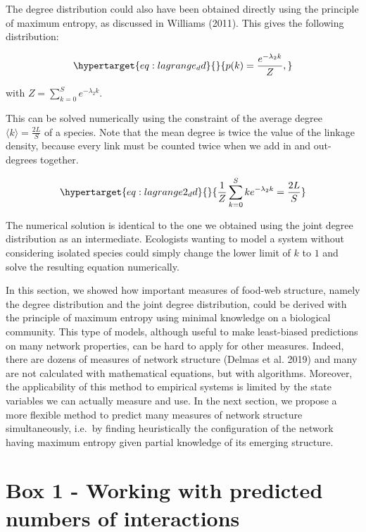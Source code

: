 \documentclass[10pt,oneside]{article}
\begin{document}
The degree distribution could also have been obtained directly using the
principle of maximum entropy, as discussed in Williams (2011). This
gives the following distribution:

\begin{equation}\protect\hypertarget{eq:lagrange_dd}{}{p(k) = \frac{e^{-\lambda_2k}}{Z},}\label{eq:lagrange_dd}\end{equation}

with \(Z = \sum_{k=0}^S e^{-\lambda_2k}.\)

This can be solved numerically using the constraint of the average
degree \(\langle k \rangle = \frac{2L}{S}\) of a species. Note that the
mean degree is twice the value of the linkage density, because every
link must be counted twice when we add in and out-degrees together.

\begin{equation}\protect\hypertarget{eq:lagrange2_dd}{}{\frac{1}{Z}\sum_{k=0}^S k e^{-\lambda_2k} = \frac{2L}{S}}\label{eq:lagrange2_dd}\end{equation}

The numerical solution is identical to the one we obtained using the
joint degree distribution as an intermediate. Ecologists wanting to
model a system without considering isolated species could simply change
the lower limit of \(k\) to \(1\) and solve the resulting equation
numerically.

In this section, we showed how important measures of food-web structure,
namely the degree distribution and the joint degree distribution, could
be derived with the principle of maximum entropy using minimal knowledge
on a biological community. This type of models, although useful to make
least-biased predictions on many network properties, can be hard to
apply for other measures. Indeed, there are dozens of measures of
network structure (Delmas et al. 2019) and many are not calculated with
mathematical equations, but with algorithms. Moreover, the applicability
of this method to empirical systems is limited by the state variables we
can actually measure and use. In the next section, we propose a more
flexible method to predict many measures of network structure
simultaneously, i.e.~by finding heuristically the configuration of the
network having maximum entropy given partial knowledge of its emerging
structure.

\hypertarget{box-1---working-with-predicted-numbers-of-interactions}{%
\section{Box 1 - Working with predicted numbers of
interactions}\label{box-1---working-with-predicted-numbers-of-interactions}}
\end{document}
